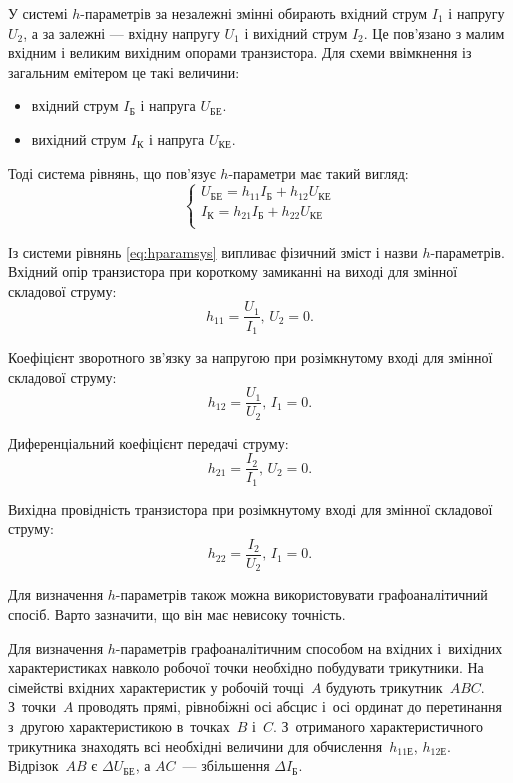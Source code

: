 \documentclass[14pt,ukrainian,utf8,simple]{eskdtext}
\begin{document}
		У системі $h$-параметрів за незалежні змінні обирають вхідний струм $I_1$ і напругу $U_2$, а за залежні --- вхідну напругу $U_1$ і вихідний струм $I_2$. Це пов'язано з малим вхідним і великим вихідним опорами транзистора. Для схеми ввімкнення із загальним емітером це такі величини:
			\begin{itemize}
				\item вхідний струм $I_{\text{Б}}$ і напруга $U_{\text{БЕ}}$.
				\item вихідний струм $I_{\text{К}}$ і напруга $U_{\text{КЕ}}$.
			\end{itemize}
			
		Тоді система рівнянь, що пов'язує $h$-параметри має такий вигляд:
		\begin{equation}
			\begin{cases}
				U_{\text{БЕ}} = h_{11} I_{\text{Б}} + h_{12} U_{\text{КЕ}}\\
				I_{\text{К}} = h_{21} I_{\text{Б}} + h_{22} U_{\text{КЕ}}\\
			\end{cases}
			\label{eq:hparamsys}
		\end{equation}
		
		Із системи рівнянь \eqref{eq:hparamsys} випливає фізичний зміст і назви $h$-па\-ра\-мет\-рів. Вхідний опір транзистора при короткому замиканні на виході для змінної складової струму:
			\[
				h_{11} = \frac{U_1}{I_1}, \, U_2 = 0.
			\]
		
		Коефіцієнт зворотного зв'язку за напругою при розімкнутому вході для змінної складової струму:
			\[
				h_{12} = \frac{U_1}{U_2}, \, I_1 = 0.
			\]
			
		Диференціальний коефіцієнт передачі струму:
			\[
				h_{21} = \frac{I_2}{I_1}, \, U_2 = 0.
			\]
			
		Вихідна провідність транзистора при розімкнутому вході для змінної складової струму:
			\[
				h_{22} = \frac{I_2}{U_2}, \, I_1 = 0.
			\]
			
		Для визначення $h$-параметрів також можна використовувати графо\-ан\-а\-лі\-тич\-ний спосіб. Варто зазначити, що він має невисоку точність.
		
		Для визначення $h$-параметрів графоаналітичним способом на вхідних і~вихідних характеристиках навколо робочої точки необхідно побудувати трикутники. На сімействі вхідних характеристик у робочій точці~$A$ будують трикутник~$ABC$. З~точки~$A$ проводять прямі, рівнобіжні осі абсцис і~осі ординат до перетинання з~другою характеристикою в~точках~$B$ і~$C$. З~отриманого характеристичного трикутника знаходять всі необхідні величини для обчислення~$h_{\text{11Е}}$, $h_{\text{12Е}}$. Відрізок~$AB$ є $\Delta U_{\text{БЕ}}$, а $AC$~— збільшення $\Delta I_{\text{Б}}$.
		
\end{document}
